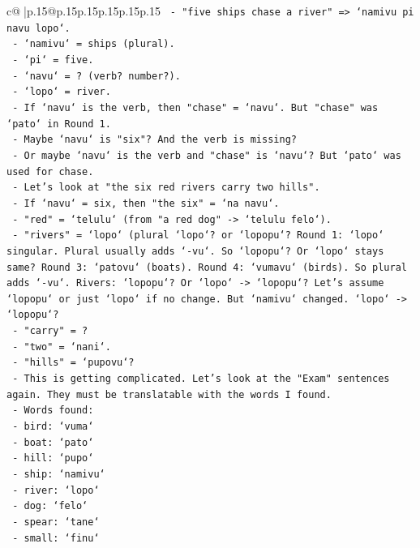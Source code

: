 \documentclass{article}
\begin{document}
{\begin{supertabular}{c@{$\;$}|p{.15\linewidth}@{}p{.15\linewidth}p{.15\linewidth}p{.15\linewidth}p{.15\linewidth}p{.15\linewidth}}
{{{\texttt{    {-} "five ships chase a river" => `namivu pi navu lopo`.} \\
\texttt{      {-} `namivu` = ships (plural).} \\
\texttt{      {-} `pi` = five.} \\
\texttt{      {-} `navu` = ? (verb? number?).} \\
\texttt{      {-} `lopo` = river.} \\
\texttt{      {-} If `navu` is the verb, then "chase" = `navu`. But "chase" was `pato` in Round 1.} \\
\texttt{      {-} Maybe `navu` is "six"? And the verb is missing?} \\
\texttt{      {-} Or maybe `navu` is the verb and "chase" is `navu`? But `pato` was used for chase.} \\
\texttt{      {-} Let's look at "the six red rivers carry two hills".} \\
\texttt{      {-} If `navu` = six, then "the six" = `na navu`.} \\
\texttt{      {-} "red" = `telulu` (from "a red dog" {-}> `telulu felo`).} \\
\texttt{      {-} "rivers" = `lopo` (plural `lopo`? or `lopopu`? Round 1: `lopo` singular. Plural usually adds `{-}vu`. So `lopopu`? Or `lopo` stays same? Round 3: `patovu` (boats). Round 4: `vumavu` (birds). So plural adds `{-}vu`. Rivers: `lopopu`? Or `lopo` {-}> `lopopu`? Let's assume `lopopu` or just `lopo` if no change. But `namivu` changed. `lopo` {-}> `lopopu`?} \\
\texttt{      {-} "carry" = ?} \\
\texttt{      {-} "two" = `nani`.} \\
\texttt{      {-} "hills" = `pupovu`?} \\
\texttt{  {-} This is getting complicated. Let's look at the "Exam" sentences again. They must be translatable with the words I found.} \\
\texttt{  {-} Words found:} \\
\texttt{    {-} bird: `vuma`} \\
\texttt{    {-} boat: `pato`} \\
\texttt{    {-} hill: `pupo`} \\
\texttt{    {-} ship: `namivu`} \\
\texttt{    {-} river: `lopo`} \\
\texttt{    {-} dog: `felo`} \\
\texttt{    {-} spear: `tane`} \\
\texttt{    {-} small: `finu`} \\
}}}
\end{supertabular}}
\end{document}
